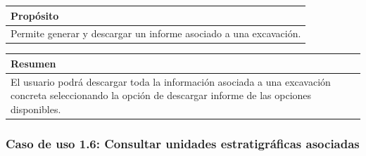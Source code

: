     \begin{table}[H]
        \centering
        \begin{tabularx}{\textwidth}{@{} |L |@{}} \hline
            \textbf{Propósito} \\
            \hline
            Permite generar y descargar un informe asociado a una excavación. \\
            \hline
        \end{tabularx}
    \end{table}

    \begin{table}[H]
        \centering
        \begin{tabularx}{\textwidth}{@{} |L |@{}} \hline
            \textbf{Resumen} \\
            \hline
            El usuario podrá descargar toda la información asociada a una excavación
            concreta seleccionando la opción de descargar informe de las opciones
            disponibles. \\
            \hline
        \end{tabularx}
    \end{table}

\subsubsection{Caso de uso 1.6: Consultar unidades estratigráficas asociadas}


